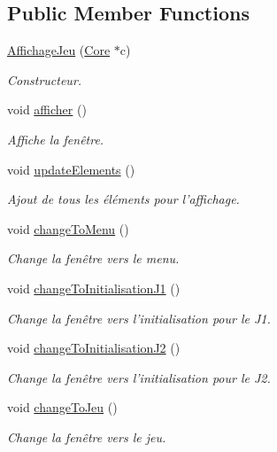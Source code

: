 \subsection*{Public Member Functions}
\begin{DoxyCompactItemize}
\item 
\hyperlink{classAffichageJeu_a2aadf21ada8d8a8d2af275842e9fbda2}{Affichage\+Jeu} (\hyperlink{classCore}{Core} $\ast$c)
\begin{DoxyCompactList}\small\item\em Constructeur. \end{DoxyCompactList}\item 
void \hyperlink{classAffichageJeu_a29d9ad7ef0161faa698bd0850efbb1fc}{afficher} ()
\begin{DoxyCompactList}\small\item\em Affiche la fenêtre. \end{DoxyCompactList}\item 
void \hyperlink{classAffichageJeu_ad17e5eea2e70c327f085b6e0ed9330e4}{update\+Elements} ()
\begin{DoxyCompactList}\small\item\em Ajout de tous les éléments pour l'affichage. \end{DoxyCompactList}\item 
void \hyperlink{classAffichageJeu_aa0fe30f907b9c0c2007466d287c701fd}{change\+To\+Menu} ()
\begin{DoxyCompactList}\small\item\em Change la fenêtre vers le menu. \end{DoxyCompactList}\item 
void \hyperlink{classAffichageJeu_a4e8693c20861bc9e79e0c0037ba4ffa8}{change\+To\+Initialisation\+J1} ()
\begin{DoxyCompactList}\small\item\em Change la fenêtre vers l'initialisation pour le J1. \end{DoxyCompactList}\item 
void \hyperlink{classAffichageJeu_a62db45f512fb855b096bcfd19e379429}{change\+To\+Initialisation\+J2} ()
\begin{DoxyCompactList}\small\item\em Change la fenêtre vers l'initialisation pour le J2. \end{DoxyCompactList}\item 
void \hyperlink{classAffichageJeu_aec00eea36f08e0bd187832d17ec32680}{change\+To\+Jeu} ()
\begin{DoxyCompactList}\small\item\em Change la fenêtre vers le jeu. \end{DoxyCompactList}\item 

\end{DoxyCompactItemize}
